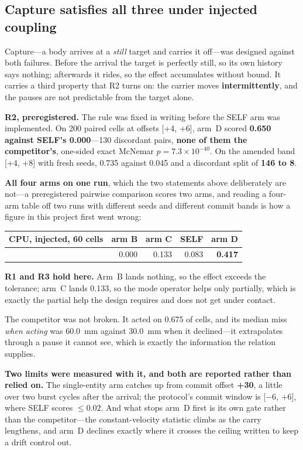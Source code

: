 \documentclass[10pt]{article}
\begin{document}
\subsection{Capture satisfies all three under injected coupling}

Capture---a body arrives at a \emph{still} target and carries it off---was
designed against both failures. Before the arrival the target is perfectly still,
so its own history says nothing; afterwards it rides, so the effect accumulates
without bound. It carries a third property that R2 turns on: the carrier moves
\textbf{intermittently}, and the pauses are not predictable from the target
alone.

\textbf{R2, preregistered.} The rule was fixed in writing before the SELF arm was
implemented. On 200 paired cells at offsets [+4, +6], arm~D scored \textbf{0.650
against SELF's 0.000}---130 discordant pairs, \textbf{none of them the
competitor's}, one-sided exact McNemar \(p = 7.3 \times 10^{-40}\). On the
amended band [+4, +8] with fresh seeds, 0.735 against 0.045 and a discordant
split of \textbf{146 to 8}.

\textbf{All four arms on one run}, which the two statements above deliberately
are not---a preregistered pairwise comparison scores two arms, and reading a
four-arm table off two runs with different seeds and different commit bands is
how a figure in this project first went wrong:

\begin{center}
\begin{tabular}{@{}lrrrr@{}}
\toprule
CPU, injected, 60 cells & arm B & arm C & SELF & \textbf{arm D} \\
\midrule
& 0.000 & 0.133 & 0.083 & \textbf{0.417} \\
\bottomrule
\end{tabular}
\end{center}

\textbf{R1 and R3 hold here.} Arm~B lands nothing, so the effect exceeds the
tolerance; arm~C lands 0.133, so the mode operator helps only partially, which is
exactly the partial help the design requires and does not get under contact.

The competitor was not broken. It acted on 0.675 of cells, and its median miss
\emph{when acting} was 60.0~mm against 30.0~mm when it declined---it extrapolates
through a pause it cannot see, which is exactly the information the relation
supplies.

\textbf{Two limits were measured with it, and both are reported rather than
relied on.} The single-entity arm catches up from commit offset \textbf{+30}, a
little over two burst cycles after the arrival; the protocol's commit window is
[\(-6\), +6], where SELF scores \(\leq 0.02\). And what stops arm~D first is its
own gate rather than the competitor---the constant-velocity statistic climbs as
the carry lengthens, and arm~D declines exactly where it crosses the ceiling
written to keep a drift control out.
\end{document}
